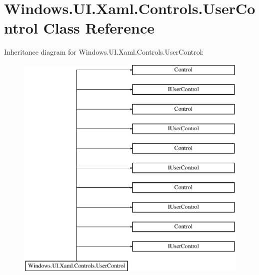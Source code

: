 \hypertarget{class_windows_1_1_u_i_1_1_xaml_1_1_controls_1_1_user_control}{}\section{Windows.\+U\+I.\+Xaml.\+Controls.\+User\+Control Class Reference}
\label{class_windows_1_1_u_i_1_1_xaml_1_1_controls_1_1_user_control}
Inheritance diagram for Windows.\+U\+I.\+Xaml.\+Controls.\+User\+Control\+:\begin{figure}[H]
\begin{center}
\leavevmode
\includegraphics[height=11.000000cm]{class_windows_1_1_u_i_1_1_xaml_1_1_controls_1_1_user_control}
\end{center}
\end{figure}
